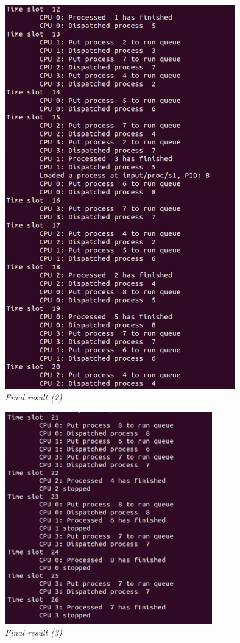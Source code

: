 \documentclass[13pt,a4paper]{article}
\begin{document}
		\begin{figure}[h!]
			\begin{center}
				\includegraphics[width=10cm]{final_2.png}
				\caption{\textit{Final result (2)}}
			\end{center}
		\end{figure}
		\begin{figure}[h!]
			\begin{center}
				\includegraphics[width=9cm]{final_3.png}
				\caption{\textit{Final result (3)}}
			\end{center}
		\end{figure}
\end{document}
